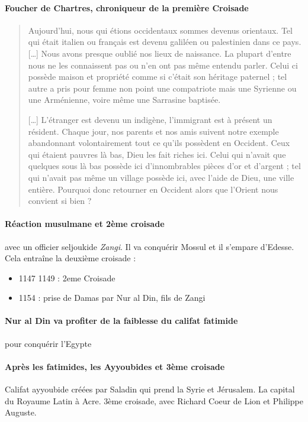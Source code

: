  \paragraph{Foucher
de Chartres, chroniqueur de la
première Croisade} 
\begin{quote}
  
Aujourd’hui, nous qui étions occidentaux sommes devenus orientaux.
Tel qui était italien ou français est
devenu galiléen ou palestinien dans ce pays. […] Nous avons presque oublié nos lieux de naissance. La
plupart d’entre nous ne les connaissent pas ou n’en ont pas même entendu parler. Celui ci possède
maison et propriété comme si c’était son héritage paternel ; tel autre a pris pour femme non point une
compatriote mais une Syrienne ou une Arménienne, voire même une Sarrasine baptisée.


[…] L’étranger est devenu un indigène, l’immigrant est à présent un résident. Chaque jour, nos parents et
nos amis suivent notre exemple abandonnant volontairement tout ce qu’ils possèdent en Occident.
Ceux qui étaient pauvres là bas, Dieu les fait riches ici. Celui qui n’avait que quelques sous là bas
possède ici d’innombrables pièces d’or et d’argent ; tel qui n’avait pas même un village possède ici, avec
l’aide de Dieu, une ville entière. Pourquoi donc retourner en Occident alors que l’Orient nous convient si
bien ? 

\end{quote}


\paragraph{Réaction musulmane et 2ème croisade} avec un officier seljoukide \textit{Zangi}. Il va conquérir Mossul et il s'empare d'Edesse. 
Cela entraîne la deuxième croisade : 
\begin{itemize}
    \item 1147
1149 : 2eme Croisade
    \item  1154 : prise de Damas par Nur
al Din, fils de Zangi
\end{itemize}

\paragraph{Nur al Din va profiter de la faiblesse du califat fatimide } pour conquérir l'Egypte

\paragraph{Après les fatimides, les Ayyoubides et 3ème croisade} Califat ayyoubide créées par Saladin qui prend la Syrie et Jérusalem. La capital du Royaume Latin à Acre. 
3ème croisade, avec Richard Coeur de Lion et Philippe 
Auguste.

